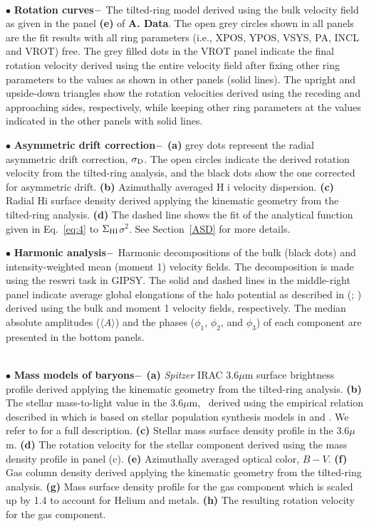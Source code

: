 \documentclass[natbib209]{emulateapj}
\begin{document}
 \\
\indent $\bullet$ {\bf Rotation curves$\--$} The tilted-ring model derived using
the bulk velocity field as given in the panel {\bf (e)} of {\bf A. Data}. The open
grey circles shown in all panels are the fit results with all ring parameters
(i.e., XPOS, YPOS, VSYS, PA, INCL and VROT) free. The grey filled dots in the VROT panel
indicate the final rotation velocity derived using the entire velocity field
after fixing other ring parameters to the values as shown in other panels (solid
lines). The upright and upside-down triangles show the rotation velocities
derived using the receding and approaching sides, respectively, while keeping
other ring parameters at the values indicated in the other panels with solid
lines.

\indent $\bullet$ {\bf Asymmetric drift correction$\--$} {\bf (a)} grey dots represent the
radial asymmetric drift correction, $\sigma_{\rm D}$. The open circles indicate
the derived rotation velocity from the tilted-ring analysis, and the black dots
show the one corrected for asymmetric drift. {\bf (b)} Azimuthally averaged H{\sc
i} velocity dispersion. {\bf (c)} Radial H{\sc i} surface density derived
applying the kinematic geometry from the tilted-ring analysis. {\bf (d)} The
dashed line shows the fit of the analytical function given in Eq.~\ref{eq:4}
to $\Sigma_{\rm HI}$$\sigma^{2}$. See Section~\ref{ASD} for more details.

\indent $\bullet$ {\bf Harmonic analysis$\--$} Harmonic decompositions of the
bulk (black dots) and intensity-weighted mean (moment 1) velocity fields. The
decomposition is made using the {\sc reswri} task in GIPSY. The solid and dashed
lines in the middle-right panel indicate average global elongations of the
halo potential as described in \citeauthor{Schoenmakers_1997}
(\citeyear{Schoenmakers_1997}; \citeyear{Schoenmakers_1999}) derived using the
bulk and moment 1 velocity fields, respectively. The median absolute amplitudes
($\langle A \rangle$) and the phases ($\phi_{1}$, $\phi_{2}$, and $\phi_{3}$) of
each component are presented in the bottom panels.
 
  \\
\indent $\bullet$ {\bf Mass models of baryons$\--$} {\bf (a)} {\it Spitzer} IRAC
3.6$\mu$m surface brightness profile derived applying the kinematic geometry
from the tilted-ring analysis. {\bf (b)} The stellar mass-to-light value in the
3.6$\mu$m, \MLsps\ derived using the empirical relation described in
\cite{Oh_2008} which is based on stellar population synthesis models in
\cite{Bruzual_Charlot_2003} and \cite{Bell_2001}. We refer to \cite{Oh_2008} for
a full description. {\bf (c)} Stellar mass surface density profile in the
3.6$\mu$m. {\bf (d)} The rotation velocity for the stellar component derived
using the mass density profile in panel (c). {\bf (e)} Azimuthally
averaged optical color, $B-V$. {\bf (f)} Gas column density derived applying the
kinematic geometry from the tilted-ring analysis. {\bf (g)} Mass surface density
profile for the gas component which is scaled up by 1.4 to account for Helium
and metals. {\bf (h)} The resulting rotation velocity for the gas component.
\end{document}
